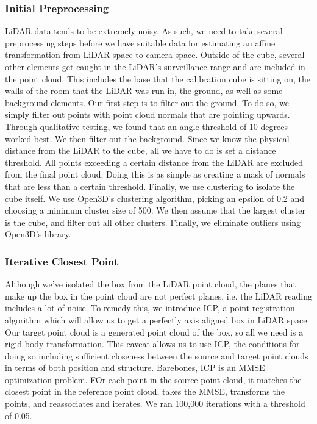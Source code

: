 \documentclass[conference]{IEEEtran}
\begin{document}
\subsubsection{Initial Preprocessing}
LiDAR data tends to be extremely noisy. As such, we need to take several preprocessing steps before we have suitable data for estimating an affine transformation from LiDAR space to camera space. Outside of the cube, several other elements get caught in the LiDAR's surveillance range and are included in the point cloud. This includes the base that the calibration cube is sitting on, the walls of the room that the LiDAR was run in, the ground, as well as some background elements. Our first step is to filter out the ground. To do so, we simply filter out points with point cloud normals that are pointing upwards. Through qualitative testing, we found that an angle threshold of 10 degrees worked best. We then filter out the background. Since we know the physical distance from the LiDAR to the cube, all we have to do is set a distance threshold. All points exceeding a certain distance from the LiDAR are excluded from the final point cloud. Doing this is as simple as creating a mask of normals that are less than a certain threshold. Finally, we use clustering to isolate the cube itself. We use Open3D's clustering algorithm, picking an epsilon of 0.2 and choosing a minimum cluster size of 500. We then assume that the largest cluster is the cube, and filter out all other clusters. Finally, we eliminate outliers using Open3D's library. 
\subsubsection{Iterative Closest Point}
Although we've isolated the box from the LiDAR point cloud, the planes that make up the box in the point cloud are not perfect planes, i.e. the LiDAR reading includes a lot of noise. To remedy this, we introduce ICP, a point registration algorithm which will allow us to get a perfectly axis aligned box in LiDAR space. Our target point cloud is a generated point cloud of the box, so all we need is a rigid-body transformation. This caveat allows us to use ICP, the conditions for doing so including sufficient closeness between the source and target point clouds in terms of both position and structure. Barebones, ICP is an MMSE optimization problem. FOr each point in the source point cloud, it matches the closest point in the reference point cloud, takes the MMSE, transforms the points, and reassociates and iterates. We ran 100,000 iterations with a threshold of 0.05. 
\end{document}
